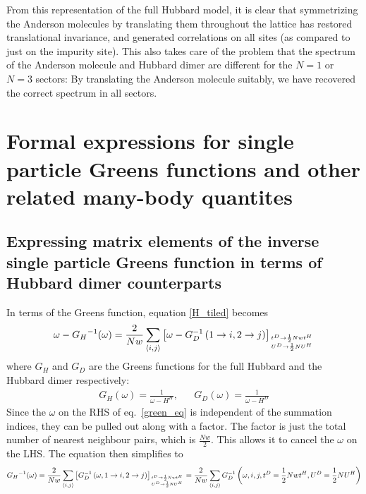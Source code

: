 \documentclass[12pt]{article}
\numberwithin{equation}{section}
\begin{document}
From this representation of the full Hubbard model, it is clear that symmetrizing the Anderson molecules by translating them throughout the lattice has restored translational invariance, and generated correlations on all sites (as compared to just on the impurity site). This also takes care of the problem that the spectrum of the Anderson molecule and Hubbard dimer are different for the $N=1$ or $N=3$ sectors: By translating the Anderson molecule suitably, we have recovered the correct spectrum in all sectors.

\section{Formal expressions for single particle Greens functions and other related many-body quantites}
\subsection{Expressing matrix elements of the inverse single particle Greens function in terms of Hubbard dimer counterparts}
In terms of the Greens function, equation \ref{H_tiled} becomes
\begin{equation}\begin{aligned}
	\label{green_eq}
	\omega - {G_H}^{-1}(\omega) = \frac{2}{Nw}\sum_{\left<i,j\right>}\left[\omega - G_D^{-1}\left(1 \to i, 2 \to j\right)\right]_{t^D \to \frac{1}{2}Nwt^H \atop{U^D \to \frac{1}{2}N U^H}}
\end{aligned}\end{equation}
where $G_H$ and $G_D$ are the Greens functions for the full Hubbard and the Hubbard dimer respectively:
\begin{equation}\begin{aligned}
	G_H(\omega) = \frac{1}{\omega - H^H}, && G_D(\omega) = \frac{1}{\omega - H^D}
\end{aligned}\end{equation}
Since the $\omega$ on the RHS of eq.~\ref{green_eq} is independent of the summation indices, they can be pulled out along with a factor. The factor is just the total number of nearest neighbour pairs, which is $\frac{Nw}{2}$. This allows it to cancel the $\omega$ on the LHS. The equation then simplifies to
\begin{equation}\begin{aligned}
	\label{green_eq_final}
{G_H}^{-1}(\omega) = \frac{2}{Nw}\sum_{\left<i,j\right>}\left[G_D^{-1}\left(\omega, 1 \to i, 2 \to j\right)\right]_{t^D \to \frac{1}{2}Nwt^H \atop{U^D \to \frac{1}{2}N U^H}} = \frac{2}{Nw}\sum_{\left<i,j\right>}G_D^{-1}\left(\omega, i, j, t^D = \frac{1}{2}Nwt^H, U^D = \frac{1}{2}N U^H\right)
\end{aligned}\end{equation}
\end{document}
